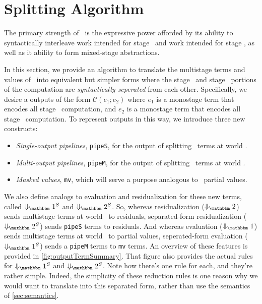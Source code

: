 
\section{Splitting Algorithm}
\label{sec:splitting}

\begin{abstrsyn}

The primary strength of \lang\ is the expressive power afforded by
its ability to syntactically interleave work intended for stage \bbone\
and work intended for stage \bbtwo, as well as it ability to form
mixed-stage abstractions. 

In this section, we provide an algorithm to translate the multistage terms and values of \lang\
into equivalent but simpler forms where the stage \bbone\ and stage \bbtwo\ portions 
of the computation are {\em syntactically seperated} from each other.
Specifically, we desire a outputs of the form $\mathcal{C}(e_1;e_2)$ where  
$e_1$ is a monostage term that encodes all stage \bbone\ computation, 
and $e_2$ is a monostage term that encodes all stage \bbtwo\ computation.
To represent outputs in this way, we introduce three new constructs:
\begin{itemize}
\item {\em Single-output pipelines}, \texttt{pipeS}, for the output of splitting \lang\ terms at world \bbtwo.
\item {\em Multi-output pipelines}, \texttt{pipeM}, for the output of splitting \lang\ terms at world \bbonem. 
\item {\em Masked values}, \texttt{mv}, which will serve a purpose analogous to \lang\ partial values.
\end{itemize}

We also define analogs to evaluation and residualization for these new terms, 
called $\sepredonesym$ and $\sepredtwosym$.
So, whereas residualization ($\redtwosym$) sends multistage terms at world \bbtwo\ to residuals, 
separated-form residualization ($\sepredtwosym$) sends \texttt{pipeS} terms to residuals.
And whereas evaluation ($\redonesym$) sends multistage terms at world \bbonem\ to partial values,
seperated-form evaluation ($\sepredonesym$) sends a \texttt{pipeM} terms to \texttt{mv} terms.
An overview of these features is provided in \ref{fig:outputTermSummary}.
That figure also provides the actual rules for $\sepredonesym$ and $\sepredtwosym$.
Note how there's one rule for each, and they're rather simple.
Indeed, the simplicity of these reduction rules is one reason why we 
would want to translate into this separated form, rather than use the semantics of \ref{sec:semantics}.


\end{abstrsyn}
